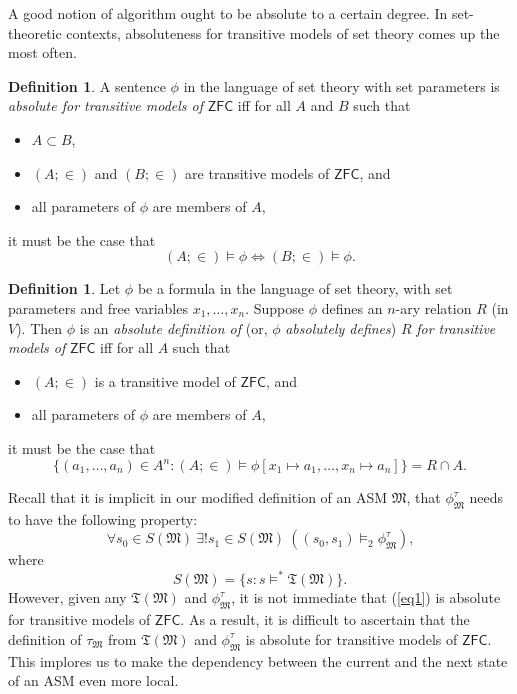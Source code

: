 \documentclass[12pt, twoside]{memoir}
\numberwithin{equation}{section}
\theoremstyle{definition}
\newtheorem{defi}[thm]{Definition}
\theoremstyle{remark}
\theoremstyle{definition}
\theoremstyle{definition}
\theoremstyle{definition}
\theoremstyle{remark}
\begin{document}
A good notion of algorithm ought to be absolute to a certain degree. In set-theoretic contexts, absoluteness for transitive models of set theory comes up the most often. 

\begin{defi}
A sentence $\phi$ in the language of set theory with set parameters is \emph{absolute for transitive models of} $\mathsf{ZFC}$ iff for all $A$ and $B$ such that
\begin{itemize}
    \item $A \subset B$,
    \item $(A; \in)$ and $(B; \in)$ are transitive models of $\mathsf{ZFC}$, and
    \item all parameters of $\phi$ are members of $A$,
\end{itemize}
it must be the case that
\begin{equation*}
    (A; \in) \models \phi \iff (B; \in) \models \phi \text{.}
\end{equation*}
\end{defi}

\begin{defi}
Let $\phi$ be a formula in the language of set theory, with set parameters and free variables $x_1, \dots, x_n$. Suppose $\phi$ defines an $n$-ary relation $R$ (in $V$). Then $\phi$ is an \emph{absolute definition of} (or, $\phi$ \emph{absolutely defines}) $R$ \emph{for transitive models of} $\mathsf{ZFC}$ iff for all $A$ such that
\begin{itemize}
    \item $(A; \in)$ is a transitive model of $\mathsf{ZFC}$, and
    \item all parameters of $\phi$ are members of $A$,
\end{itemize}
it must be the case that
\begin{equation*}
     \{(a_1, \dots, a_n) \in A^n : (A; \in) \models \phi[x_1 \mapsto a_1, \dots, x_n \mapsto a_n]\} = R \cap A \text{.}
\end{equation*}
\end{defi}

Recall that it is implicit in our modified definition of an ASM $\mathfrak{M}$, that $\phi^{\tau}_{\mathfrak{M}}$ needs to have the following property:
\begin{equation}\label{eq1}
    \forall s_0 \in S(\mathfrak{M}) \ \exists ! s_1 \in S(\mathfrak{M}) \ ((s_0, s_1) \models_2 \phi^{\tau}_{\mathfrak{M}}) \text{,}
\end{equation}
where
\begin{equation*}
    S(\mathfrak{M}) = \{s : s \models^* \mathfrak{T}(\mathfrak{M})\} \text{.}
\end{equation*}
However, given any $\mathfrak{T}(\mathfrak{M})$ and $\phi^{\tau}_{\mathfrak{M}}$, it is not immediate that (\ref{eq1}) is absolute for transitive models of $\mathsf{ZFC}$. As a result, it is difficult to ascertain that the definition of $\tau_{\mathfrak{M}}$ from $\mathfrak{T}(\mathfrak{M})$ and $\phi^{\tau}_{\mathfrak{M}}$ is absolute for transitive models of $\mathsf{ZFC}$. This implores us to make the dependency between the current and the next state of an ASM even more local.
\end{document}

